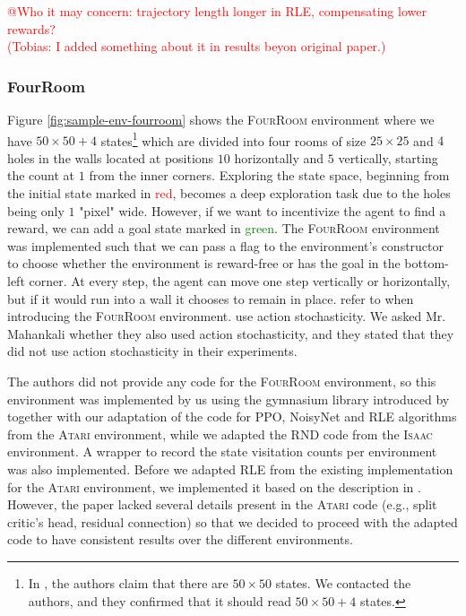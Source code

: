 \documentclass[10pt]{article} %
\begin{document}
\textcolor{red}{@Who it may concern: trajectory length longer in RLE, compensating lower rewards?\\(Tobias: I added something about it in results beyon original paper.)}

\subsubsection{FourRoom}
Figure \ref{fig:sample-env-fourroom} shows the \textsc{FourRoom} environment where we have $50\times50 + 4$ states\footnote{In \cite{rle-paper}, the authors claim that there are $50\times 50$ states. We contacted the authors, and they confirmed that it should read $50\times 50 + 4$ states.} which are divided into four rooms of size $25\times25$ and $4$ holes in the walls located at positions $10$ horizontally and $5$ vertically, starting the count at $1$ from the inner corners. Exploring the state space, beginning from the initial state marked in \textcolor{red}{red}, becomes a deep exploration task due to the holes being only $1$ "pixel" wide. However, if we want to incentivize the agent to find a reward, we can add a goal state marked in \textcolor{green}{green}. The \textsc{FourRoom} environment was implemented such that we can pass a flag to the environment's constructor to choose whether the environment is reward-free or has the goal in the bottom-left corner. At every step, the agent can move one step vertically or horizontally, but if it would run into a wall it chooses to remain in place. \cite{rle-paper} refer to \cite{grid-world-paper} when introducing the \textsc{FourRoom} environment. \cite{grid-world-paper} use action stochasticity. We asked Mr. Mahankali whether they also used action stochasticity, and they stated that they did not use action stochasticity in their experiments. 

The authors did not provide any code for the \textsc{FourRoom} environment, so this environment was implemented by us using the gymnasium library introduced by \cite{gymnasium-paper} together with our adaptation of the code for PPO, NoisyNet and RLE algorithms from the \textsc{Atari} environment, while we adapted the RND code from the \textsc{Isaac} environment. A wrapper to record the state visitation counts per environment was also implemented. Before we adapted RLE from the existing implementation for the \textsc{Atari} environment, we implemented it based on the description in \cite{rle-paper}. However, the paper lacked several details present in the \textsc{Atari} code (e.g., split critic's head, residual connection) so that we decided to proceed with the adapted code to have consistent results over the different environments. 
\end{document}
